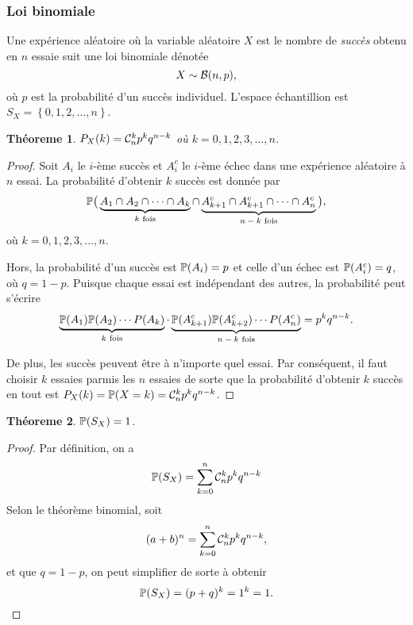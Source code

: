 \documentclass[11pt]{article}
\newcommand\comb[2]{%
	\ensuremath{%
		\mathcal{C}_{#2}^{#1}%
	}%
}%
\renewcommand\P{%
	\ensuremath{%
		\mathbb{P}%
	}%
}%
\newcommand\bin{%
	\ensuremath{%
		\mathcal{B}%
	}%
}%
\newtheorem{theoreme}{Théoreme}[section]
\begin{document}
\subsubsection{Loi binomiale}
Une expérience aléatoire où la variable aléatoire $X$ est le nombre de
\textit{succès} obtenu en $n$ essaie suit une loi binomiale dénotée
\begin{equation*}
	X\sim\bin(n,p),
\end{equation*}
où $p$ est la probabilité d'un succès individuel. L'espace échantillion est
$S_X=\left\{0,1,2,\dots,n\right\}$.

\begin{theoreme}
	$P_X(k)=\comb{k}{n}p^kq^{n-k}$ où $k=0,1,2,3,\dots,n$.
\end{theoreme}

\begin{proof}
	Soit $A_i$ le $i$-ème succès et $A_i^c$ le $i$-ème échec dans une
	expérience aléatoire à $n$ essai. La probabilité d'obtenir $k$ succès est
	donnée par
	\begin{equation*}
		\P\big(
			\underbrace{A_1\cap A_2\cap\cdots\cap A_k}_\text{$k$ fois}
			\cap
			\underbrace{A_{k+1}^c\cap A_{k+1}^c\cap\cdots\cap A_n^c}_
			\text{$n-k$ fois}
		\big),
	\end{equation*}
	où $k=0,1,2,3,\dots,n$.

	Hors, la probabilité d'un succès est $\P(A_i)=p$ et celle d'un échec est
	$\P(A_i^c)=q$, où $q=1-p$. Puisque chaque essai est indépendant des autres,
	la probabilité peut s'écrire
	\begin{equation*}
		\underbrace{
			\P(A_1)\P(A_2)\cdots P(A_k)
		}_\text{$k$ fois}
		\cdot
		\underbrace{
			\P(A_{k+1}^c)\P(A_{k+2}^c)\cdots P(A_n^c)
		}_\text{$n-k$ fois}
		=p^kq^{n-k}.
	\end{equation*}

	De plus, les succès peuvent être à n'importe quel essai. Par conséquent,
	il faut choisir $k$ essaies parmis les $n$ essaies de sorte que la
	probabilité d'obtenir $k$ succès en tout est
	$P_X(k)=\P(X=k)=\comb{k}{n}p^kq^{n-k}$.
\end{proof}

\begin{theoreme}
	$\P(S_X)=1$.
\end{theoreme}

\begin{proof}
	Par définition, on a
	\begin{equation*}
		\P(S_X)=\sum_{k=0}^n\comb{k}{n}p^kq^{n-k}
	\end{equation*}
	Selon le théorème binomial, soit
	\begin{equation*}
		(a+b)^n=\sum_{k=0}^n\comb{k}{n}p^kq^{n-k},
	\end{equation*}
	et que $q=1-p$, on peut simplifier de sorte à obtenir
	\begin{equation*}
		\P(S_X)=(p+q)^k=1^k=1.
	\end{equation*}
\end{proof}
\end{document}

